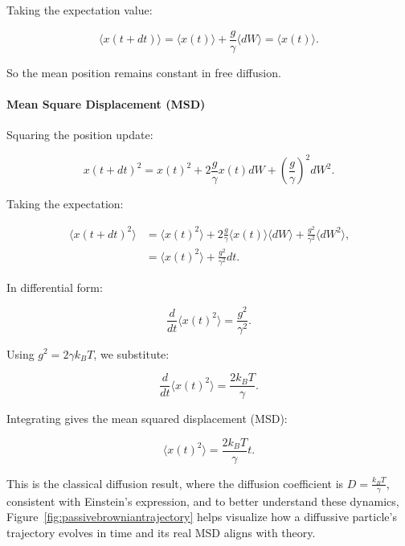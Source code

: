 Taking the expectation value:

\begin{equation}
  \langle x(t + dt) \rangle = \langle x(t) \rangle + \frac{g}{\gamma} \langle dW \rangle = \langle x(t) \rangle \text{.}
\end{equation}

So the mean position remains constant in free diffusion.

\paragraph{Mean Square Displacement (MSD)}

Squaring the position update:

\begin{equation}
  x(t + dt)^2 = x(t)^2 + 2 \frac{g}{\gamma} x(t) dW + \left( \frac{g}{\gamma} \right)^2 dW^2 \text{.}
\end{equation}

Taking the expectation:

\begin{align}
  \langle x(t + dt)^2 \rangle &= \langle x(t)^2 \rangle + 2 \frac{g}{\gamma} \langle x(t) \rangle \langle dW \rangle + \frac{g^2}{\gamma^2} \langle dW^2 \rangle \text{,}\\
  &= \langle x(t)^2 \rangle + \frac{g^2}{\gamma^2} dt \text{.}
\end{align}

In differential form:

\begin{equation}
  \frac{d}{dt} \langle x(t)^2 \rangle = \frac{g^2}{\gamma^2} \text{.}
\end{equation}

Using \( g^2 = 2 \gamma k_B T \), we substitute:

\begin{equation}
  \frac{d}{dt} \langle x(t)^2 \rangle = \frac{2 k_B T}{\gamma} \text{.}
\end{equation}

Integrating gives the mean squared displacement (MSD):

\begin{equation}
  \langle x(t)^2 \rangle = \frac{2 k_B T}{\gamma} t \text{.}
\end{equation}

This is the classical diffusion result, where the diffusion coefficient is \( D = \frac{k_B T}{\gamma} \), consistent with Einstein's expression, and to better understand these dynamics, Figure~\ref{fig:passivebrowniantrajectory} helps visualize how a diffussive particle's trajectory evolves in time and its real MSD aligns with theory.



